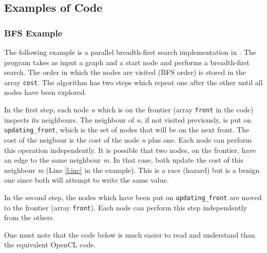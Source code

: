\subsection{Examples of \pencil Code}

\subsubsection{BFS Example}


The following example is a parallel breadth-first search implementation
in \pencil.  The program takes as input a graph and a start node and
performs a breadth-first search.  The order in which the nodes are
visited (BFS order) is stored in the array \lstinline!cost!.  The algorithm has
two steps which repeat one after the other until all nodes have been explored.

In the first step, each node \emph{n} which is on the frontier (array \lstinline!front!
in the code) inspects its neighbours.  The neighbour of \emph{n}, if not visited previously,
is put on \lstinline!updating_front!, which is the set of nodes that will be on
the next front.  The cost of the neigbour is the cost of the node \emph{n} plus one.
Each node can perform this operation independently.  It is possible
that two nodes, on the frontier, have an edge to the same neighbour \emph{m}.  In that
case, both update the cost of this neighbour \emph{m} (Line \ref{l:inc} in the example).
This is a race (hazard) but is a benign one since both will attempt to
write the same value.

In the second step, the nodes which have been put on \lstinline!updating_front!
are moved to the frontier (array \lstinline!front!).  Each node can perform
this step independently from the others.

One must note that the \pencil code below is much easier to read and understand
than the equivalent OpenCL code.


